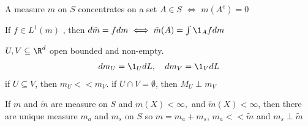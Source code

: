 \begin{definition}
	A measure $m$ on $S$ concentrates on a set $A \in S$ $\iff $ $m(A^{c}) = 0$
\end{definition}

\begin{remark}
	If $f \in L^{1} (m)$ , then $d\tilde{m} = f dm \iff \tilde{m} (A) = \int \1_{A}f dm$
\end{remark}


\begin{example}
	$U, V \subseteq  \R^{d}$ open bounded and non-empty.
	\begin{align*}
		d m_{U} = \1_{U} dL, \quad d m_{V} = \1_{V} dL
	\end{align*} if $U \subseteq V$, then $m_{U} << m_{V}$.
	if $U \cap V = \emptyset$, then $M_{U} \perp m_{V}$
\end{example}

\begin{theorem}
	If $m$ and $\tilde m$ are measure on  $S$ and  $m(X) < \infty,$ and $\tilde m (X) < \infty$, then there are unique measure $m_{a}$ and $m_{s}$ on $S$ so $m = m_{a} + m_{s}$, $m_{a} << \tilde m$ and $m_{s} \perp \tilde m$
\end{theorem}

